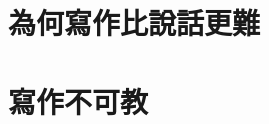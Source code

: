 \documentclass[11pt,oneside]{book}
\begin{document}
\part{為何寫作比說話更難}












\part{寫作不可教}

\end{document}
